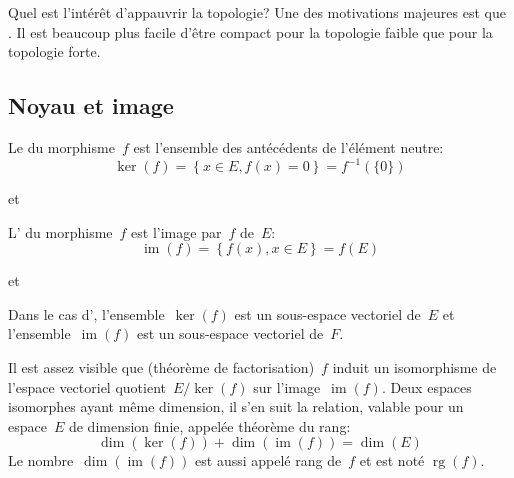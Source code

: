 \begin{remarque}
\medskip
Quel est l'intérêt d'appauvrir la topologie? 
Une des motivations majeures est que . Il est beaucoup plus facile d'être compact pour la topologie faible que pour la topologie forte.
\end{remarque}

\medskip
\subsection{Noyau et image}

\begin{definition}[Noyau]
Le  du morphisme~$f$ est l'ensemble des antécédents de l'élément neutre:
\begin{equation}
  \ker(f)=\left\{x\in E, f(x)=0\right\}=f^{-1}(\{0\})\end{equation}
\end{definition}
et 

\medskip
\begin{definition}[Image]
L' du morphisme~$f$ est l'image par~$f$ de~$E$:
\begin{equation}
 \operatorname{im}(f)=\left\{ f(x), x\in E\right\}=f(E)\end{equation}
\end{definition}
et 

\medskip
Dans le cas d',
l'ensemble~$\ker(f)$ est un sous-espace vectoriel de~$E$ et
l'ensemble~$\operatorname{im}(f)$ est un sous-espace vectoriel de~$F$.

\begin{theoreme}
Il est assez visible que (théorème de factorisation)~$f$ induit un isomorphisme de l'espace vectoriel quotient~$E/\ker(f)$ sur l'image~$\operatorname{im}(f)$.
Deux espaces isomorphes ayant même dimension, il s'en suit la relation, valable pour un espace~$E$ de dimension finie, appelée théorème du rang:
\begin{equation}
  \dim(\ker(f)) + \dim(\operatorname{im}(f)) = \dim( E )
\end{equation}
Le nombre~$\dim(\operatorname{im}(f))$ est aussi appelé rang de~$f$ et est noté
$\operatorname{rg}(f)$.
\end{theoreme}

